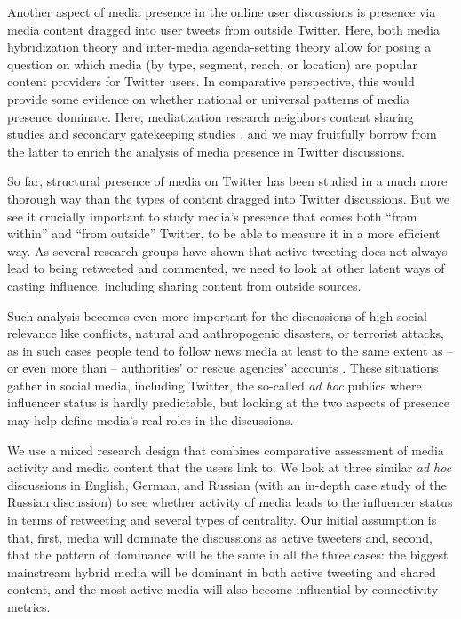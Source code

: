 Another aspect of media presence in the online user discussions is presence via media content dragged into user tweets from outside Twitter. Here, both media hybridization theory \cite{Chadwick} and inter-media agenda-setting theory \cite[p.~113--117]{McCombs2004} allow for posing a question on which media (by type, segment, reach, or location) are popular content providers for Twitter users. In comparative perspective, this would provide some evidence on whether national or universal patterns of media presence dominate. Here, mediatization research neighbors content sharing studies \cite{BakshyRosennMarlow,Singer} and secondary gatekeeping studies \cite{Nielsen}, and we may fruitfully borrow from the latter to enrich the analysis of media presence in Twitter discussions.

So far, structural presence of media on Twitter has been studied in a much more thorough way than the types of content dragged into Twitter discussions. But we see it crucially important to study media’s presence that comes both “from within” and “from outside” Twitter, to be able to measure it in a more efficient way. As several research groups have shown that active tweeting does not always lead to being retweeted and commented, we need to look at other latent ways of casting influence, including sharing content from outside sources.

Such analysis becomes even more important for the discussions of high social relevance like conflicts, natural and anthropogenic disasters, or terrorist attacks, as in such cases people tend to follow news media at least to the same extent as -- or even more than -- authorities’ or rescue agencies’ accounts \cite{ChewEysenbach,Bruns2014}. These situations gather in social media, including Twitter, the so-called \textit{ad hoc} publics where influencer status is hardly predictable, but looking at the two aspects of presence may help define media’s real roles in the discussions.

We use a mixed research design that combines comparative assessment of media activity and media content that the users link to. We look at three similar \textit{ad hoc} discussions in English, German, and Russian (with an in-depth case study of the Russian discussion) to see whether activity of media leads to the influencer status in terms of retweeting and several types of centrality. Our initial assumption is that, first, media will dominate the discussions as active tweeters and, second, that the pattern of dominance will be the same in all the three cases: the biggest mainstream hybrid media will be dominant in both active tweeting and shared content, and the most active media will also become influential by connectivity metrics.

